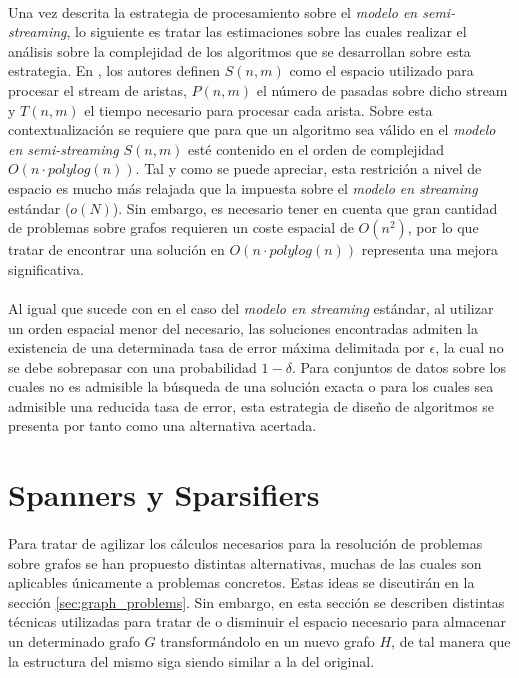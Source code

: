 \documentclass{subfiles}
\begin{document}
      \paragraph{}
      Una vez descrita la estrategia de procesamiento sobre el \emph{modelo en semi-streaming}, lo siguiente es tratar las estimaciones sobre las cuales realizar el análisis sobre la complejidad de los algoritmos que se desarrollan sobre esta estrategia. En \cite{feigenbaum2005graph}, los autores definen $S(n,m)$ como el espacio utilizado para procesar el stream de aristas, $P(n,m)$ el número de pasadas sobre dicho stream y $T(n,m)$ el tiempo necesario para procesar cada arista. Sobre esta contextualización se requiere que para que un algoritmo sea válido en el \emph{modelo en semi-streaming} $S(n,m)$ esté contenido en el orden de complejidad $O(n \cdot polylog(n))$. Tal y como se puede apreciar, esta restrición a nivel de espacio es mucho más relajada que la impuesta sobre el \emph{modelo en streaming} estándar ($o(N)$). Sin embargo, es necesario tener en cuenta que gran cantidad de problemas sobre grafos requieren un coste espacial de $O(n^2)$, por lo que tratar de encontrar una solución en $O(n \cdot polylog(n))$ representa una mejora significativa.

      \paragraph{}
      Al igual que sucede con en el caso del \emph{modelo en streaming} estándar, al utilizar un orden espacial menor del necesario, las soluciones encontradas admiten la existencia de una determinada tasa de error máxima delimitada por $\epsilon$, la cual no se debe sobrepasar con una probabilidad $1-\delta$. Para conjuntos de datos sobre los cuales no es admisible la búsqueda de una solución exacta o para los cuales sea admisible una reducida tasa de error, esta estrategia de diseño de algoritmos se presenta por tanto como una alternativa acertada.

    \section{Spanners y Sparsifiers}
    \label{sec:spanners_sparsifiers}

      \paragraph{}
      Para tratar de agilizar los cálculos necesarios para la resolución de problemas sobre grafos se han propuesto distintas alternativas, muchas de las cuales son aplicables únicamente a problemas concretos. Estas ideas se discutirán en la sección \ref{sec:graph_problems}. Sin embargo, en esta sección se describen distintas técnicas utilizadas para tratar de  o disminuir el espacio necesario para almacenar un determinado grafo $G$ transformándolo en un nuevo grafo $H$, de tal manera que la estructura del mismo siga siendo similar a la del original.
\end{document}

